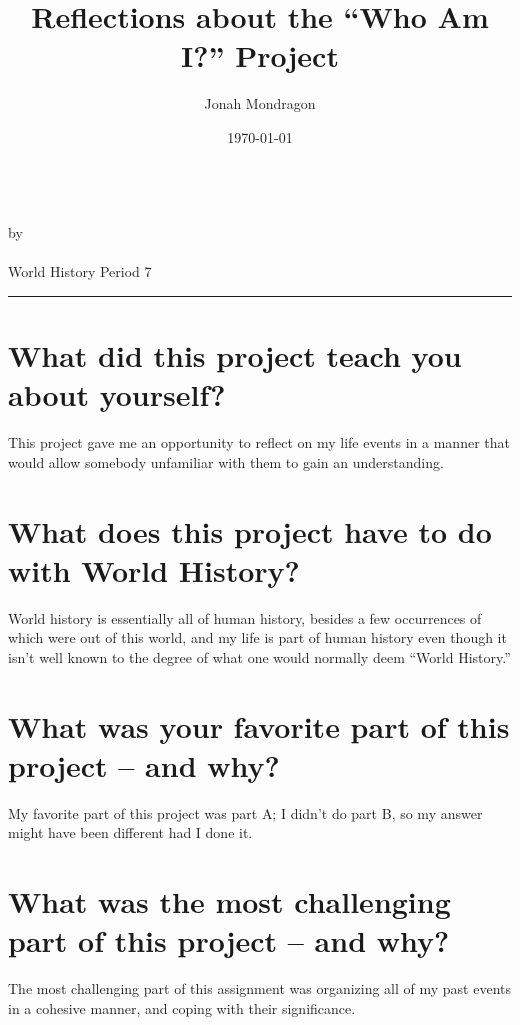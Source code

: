 \documentclass[12pt]{article}
\newcommand{\PutTitle}[1]
{
    \begin{center}
        {\huge\bfseries\thetitle}\\
        by \theauthor\\
        \thedate\\
        #1        
    \end{center}
    \hrule
    \vspace{2ex}
}
\begin{document}
\title{Reflections about the ``Who Am I?'' Project}
\author{Jonah Mondragon}
\date{\today}
\PutTitle{World History Period 7}

\doublespacing

\section*{What did this project teach you about yourself?}

This project gave me an opportunity to reflect on my life events in a manner
that would allow somebody unfamiliar with them to gain an understanding.

\section*{What does this project have to do with World History?}

World history is essentially all of human history, besides a few occurrences of
which were out of this world, and my life is part of human history even though
it isn't well known to the degree of what one would normally deem ``World
History.''

\section*{What was your favorite part of this project – and why?}

My favorite part of this project was part A; I didn't do part B, so my answer
might have been different had I done it.

\section*{What was the most challenging part of this project – and why?}

The most challenging part of this assignment was organizing all of my past
events in a cohesive manner, and coping with their significance.
\end{document}
